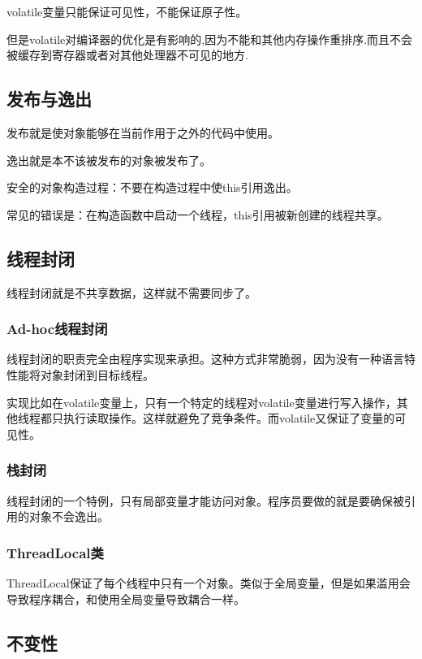 volatile变量只能保证可见性，不能保证原子性。

但是volatile对编译器的优化是有影响的,因为不能和其他内存操作重排序.而且不会被缓存到寄存器或者对其他处理器不可见的地方.



\subsection{发布与逸出}

发布就是使对象能够在当前作用于之外的代码中使用。

逸出就是本不该被发布的对象被发布了。

安全的对象构造过程：不要在构造过程中使this引用逸出。

常见的错误是：在构造函数中启动一个线程，this引用被新创建的线程共享。

\subsection{线程封闭}

线程封闭就是不共享数据，这样就不需要同步了。

\subsubsection{Ad-hoc线程封闭}

线程封闭的职责完全由程序实现来承担。这种方式非常脆弱，因为没有一种语言特性能将对象封闭到目标线程。

实现比如在volatile变量上，只有一个特定的线程对volatile变量进行写入操作，其他线程都只执行读取操作。这样就避免了竞争条件。而volatile又保证了变量的可见性。

\subsubsection{栈封闭}

线程封闭的一个特例，只有局部变量才能访问对象。程序员要做的就是要确保被引用的对象不会逸出。

\subsubsection{ThreadLocal类}

ThreadLocal保证了每个线程中只有一个对象。类似于全局变量，但是如果滥用会导致程序耦合，和使用全局变量导致耦合一样。


\subsection{不变性}

